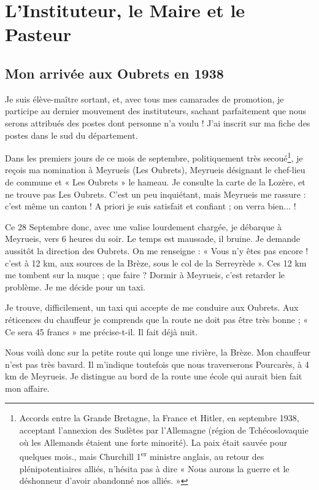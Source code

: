
\section*{L'Instituteur, le Maire et le Pasteur}

\subsection*{Mon arrivée aux Oubrets en 1938}

Je suis élève-maître sortant, et, avec tous mes camarades de promotion, je participe au dernier mouvement des instituteurs, sachant parfaitement que nous serons attribués des postes dont personne n'a voulu ! J'ai inscrit sur ma fiche des postes dans le sud du département.

Dans les premiers jours de ce mois de septembre, politiquement très secoué\footnote{Accords entre la Grande Bretagne, la France et Hitler, en septembre 1938, acceptant l'annexion des Sudètes par l'Allemagne (région de Tchécoslovaquie où les Allemands étaient une forte minorité). La paix était sauvée pour quelques mois., mais Churchill 1\textsuperscript{er} ministre anglais, au retour des plénipotentiaires alliés, n'hésita pas à dire « Nous aurons la guerre et le déshonneur d'avoir abandonné nos alliés. »}, je reçois ma nomination à Meyrueis (Les Oubrets), Meyrueis désignant le chef-lieu de commune et « Les Oubrets » le hameau. Je consulte la carte de la Lozère, et ne trouve pas Les Oubrets. C'est un peu inquiétant, mais Meyrueis me rassure : c'est même un canton ! A priori je suis satisfait et confiant ; on verra bien... !

Ce 28 Septembre donc, avec une valise lourdement chargée, je débarque à Meyrueis, vers 6 heures du soir. Le temps est maussade, il bruine. Je demande aussitôt la direction des Oubrets. On me renseigne : « Vous n'y êtes pas encore ! c'est à 12 km, aux sources de la Brèze, sous le col de la Serreyrède ». Ces 12 km me tombent sur la nuque ; que faire ? Dormir à Meyrueis, c'est retarder le problème. Je me décide pour un taxi.

Je trouve, difficilement, un taxi qui accepte de me conduire aux Oubrets. Aux réticences du chauffeur je comprends que la route ne doit pas être très bonne ; « Ce sera 45 francs » me précise-t-il. Il fait déjà nuit.

Nous voilà donc sur la petite route qui longe une rivière, la Brèze. Mon chauffeur n'est pas très bavard. Il m'indique toutefois que nous traverserons Pourcarès, à 4 km de Meyrueis. Je distingue au bord de la route une école qui aurait bien fait mon affaire.

